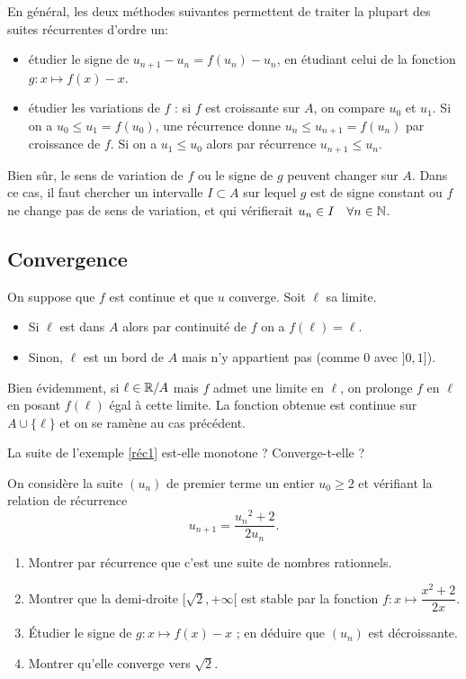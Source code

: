 \documentclass[../main.tex]{subfiles}
\begin{document}
En général, les deux méthodes suivantes permettent de traiter la plupart des suites récurrentes d'ordre un:
\begin{itemize}
    \item étudier le signe de $u_{n+1}-u_n=f(u_n)-u_n$, en étudiant celui de la fonction $g:x\mapsto f(x) - x$. 
    \item étudier les variations de $f$ : si $f$ est croissante sur $A$, on compare $u_0$ et $u_1$. Si on a $u_0\leq u_1=f(u_0)$, une récurrence donne $u_n\leq u_{n+1}=f(u_n)$ par croissance de $f$. Si on a $u_1\leq u_0$ alors par récurrence $u_{n+1}\leq u_n$.
\end{itemize}
Bien sûr, le sens de variation de $f$ ou le signe de $g$ peuvent changer sur $A$. Dans ce cas, il faut chercher un intervalle $I\subset A$ sur lequel $g$ est de signe constant ou $f$ ne change pas de sens de variation, et qui vérifierait $u_n\in I\quad \forall n\in\mathbb N$.


\subsection{Convergence}

\begin{prop}
    On suppose que $f$ est continue et que $u$ converge. Soit $\ell$ sa limite. 
    \begin{itemize}
        \item Si $\ell$ est dans $A$ alors par continuité de $f$ on a $f(\ell)=\ell$.
        \item Sinon, $\ell$ est un bord de $A$ mais n'y appartient pas (comme $0$ avec $]0,1]$).
    \end{itemize}
\end{prop}

\begin{rem}
    Bien évidemment, si $\ell\in \mathbb R/A$ mais $f$ admet une limite en $\ell$, on prolonge $f$ en $\ell$ en posant $f(\ell)$ égal à cette limite. La fonction obtenue est continue sur $A\cup\{\ell\}$ et on se ramène au cas précédent.
\end{rem}

\begin{exo}[M]
	La suite de l'exemple \ref{réc1} est-elle monotone ? Converge-t-elle ?
\end{exo}

\begin{exo}[D]
	On considère la suite $(u_n)$ de premier terme un entier $u_0\geq 2$ et vérifiant la relation de récurrence \[u_{n+1}=\frac{{u_n}^2+2}{2u_n}.\] 
	\begin{enumerate}
		\item Montrer par récurrence que c'est une suite de nombres rationnels.
		\item Montrer que la demi-droite $[\sqrt{2},+\infty[$ est stable par la fonction $f:x\longmapsto \dfrac{x^2 + 2}{2x}$.
		\item Étudier le signe de $g:x\longmapsto f(x)-x$ ; en déduire que $(u_n)$ est décroissante.
		\item Montrer qu'elle converge vers $\sqrt{2}$.
	\end{enumerate}
\end{exo}
\end{document}
